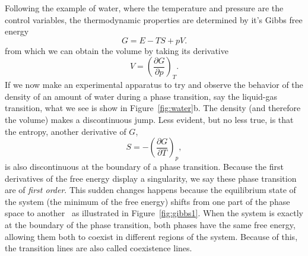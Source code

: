 Following the example of water, where the temperature and pressure are the
control variables, the thermodynamic properties are determined by it's Gibbs
free energy
\begin{equation}
    G=E-TS+pV.
\end{equation}
from which we can obtain the volume by taking its derivative
\begin{equation}
    V={\left(\frac{\partial G}{\partial p}\right)}_T.
\end{equation}
If we now make an experimental apparatus to try and observe the behavior of the
density of an amount of water during a phase transition, say the liquid-gas
transition, what we see is show in Figure~\ref{fig:water}b. The density (and
therefore the volume) makes a discontinuous jump. Less evident, but no less
true, is that the entropy, another derivative of $G$,
\begin{equation}
    S=-{\left(\frac{\partial G}{\partial T}\right)}_p,
\end{equation}
is also discontinuous at the boundary of a phase transition. Because the first
derivatives of the free energy display a singularity, we say these phase
transition are of \textit{first order}. This sudden changes happens because the
equilibrium state of the system (the minimum of the free energy) shifts from
one part of the phase space to another~\cite{Callen1985} as illustrated in
Figure~\ref{fig:gibbs1}. When the system is exactly at the boundary of the
phase transition, both phases have the same free energy, allowing them both to
coexist in different regions of the system. Because of this, the transition
lines are also called coexistence lines.

